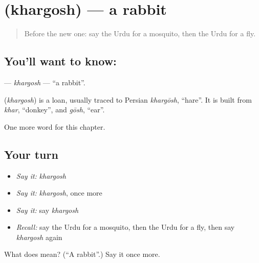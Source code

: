\section[\texorpdfstring{\ur{خرگوش} (khargosh)}{خرگوش (khargosh)}]{ (khargosh) — a rabbit}

\label{lesson:UR-C127-khargosh}



\begin{quote}
Before the new one: say the Urdu for a mosquito, then the Urdu for a fly.
\end{quote}

\subsection*{You'll want to know: }
\textbf{} — \emph{khargosh} — \textquotedblleft{}a rabbit\textquotedblright{}.

\begin{cousinweb}
\textbf{} (\emph{khargosh}) is a loan, usually traced to Persian \emph{khargōsh}, \textquotedblleft{}hare\textquotedblright{}. It is built from \emph{khar}, \textquotedblleft{}donkey\textquotedblright{}, and \emph{gōsh}, \textquotedblleft{}ear\textquotedblright{}.
\end{cousinweb}

\begin{grammarlens}[title={What you've built}]
One more word for this chapter.
\end{grammarlens}

\subsection*{Your turn}
\begin{itemize}
\raggedright
  \item \emph{Say it:} \emph{khargosh}
  \item \emph{Say it:} \emph{khargosh}, once more
  \item \emph{Say it:} say \emph{khargosh}
  \item \emph{Recall:} say the Urdu for a mosquito, then the Urdu for a fly, then say \emph{khargosh} again
\end{itemize}

\begin{tcolorbox}[breakable,colback=teal!4,colframe=teal!35!black,title={Before you move on}]
What does  mean? (\textquotedblleft{}A rabbit\textquotedblright{}.) Say it once more.
\end{tcolorbox}
